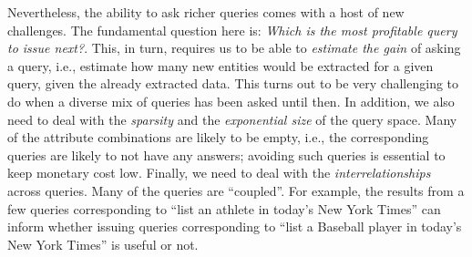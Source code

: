Nevertheless, the ability to ask richer queries comes with a host of new challenges. The fundamental question here is: {\em Which is the most profitable query to issue next?}. This, in turn, requires us to be able to {\em estimate the gain} of asking a query, i.e., estimate how many new entities would be extracted for a given query, given the already extracted data. This turns out to be very challenging to do when a diverse mix of queries has been asked until then. In addition, we also need to deal with the {\em sparsity} and the {\em exponential size} of the query space. Many of the attribute combinations are likely to be empty, i.e., the corresponding queries are likely to not have any answers; avoiding such queries is essential to keep monetary cost low. Finally, we need to deal with the {\em interrelationships} across queries. Many of the queries are ``coupled''. For example, the results from a few queries corresponding to ``list an athlete in today's New York Times'' can inform whether issuing queries corresponding to ``list a Baseball player in today's New York Times'' is useful or not. 

